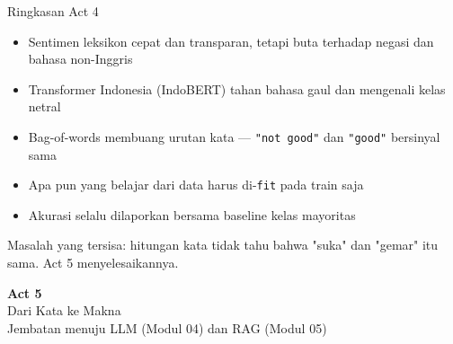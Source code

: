 \documentclass[aspectratio=169,t]{beamer}
\newcommand{\acttitle}[3]{%
  \begin{frame}[plain]
    \vspace{1.5cm}
    \begin{center}
      {\color{nvgreen}\Huge\bfseries Act #1}\\[1.2em]
      {\color{nvwhite}\Huge #2}\\[0.8em]
      {\color{nvgray}\Large #3}
    \end{center}
  \end{frame}%
}
\begin{document}
\begin{frame}{Ringkasan Act 4}
  \begin{itemize}
    \item[\textcolor{nvgreen}{\checkmark}] Sentimen leksikon cepat dan transparan, tetapi buta terhadap negasi dan bahasa non-Inggris
    \item[\textcolor{nvgreen}{\checkmark}] Transformer Indonesia (IndoBERT) tahan bahasa gaul dan mengenali kelas netral
    \item[\textcolor{nvgreen}{\checkmark}] Bag-of-words membuang urutan kata --- \texttt{"not good"} dan \texttt{"good"} bersinyal sama
    \item[\textcolor{nvgreen}{\checkmark}] Apa pun yang belajar dari data harus di-\texttt{fit} pada train saja
    \item[\textcolor{nvgreen}{\checkmark}] Akurasi selalu dilaporkan bersama baseline kelas mayoritas
  \end{itemize}
  \vspace{0.7em}
  \begin{center}
    {\color{nvlightgreen}\small Masalah yang tersisa: hitungan kata tidak tahu bahwa "suka" dan "gemar" itu sama.
    Act 5 menyelesaikannya.}
  \end{center}
\end{frame}

\acttitle{5}{Dari Kata ke Makna}{Jembatan menuju LLM (Modul 04) dan RAG (Modul 05)}
\end{document}
